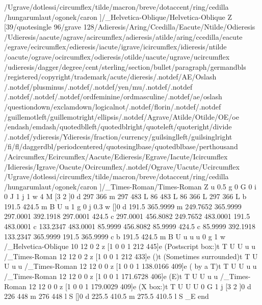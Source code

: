 {{{{{{{{{{{{{{{/Ugrave/dotlessi/circumflex/tilde/macron/breve/dotaccent/ring/cedilla
/hungarumlaut/ogonek/caron
]/_Helvetica-Oblique/Helvetica-Oblique Z
[39/quotesingle 96/grave 128/Adieresis/Aring/Ccedilla/Eacute/Ntilde/Odieresis
/Udieresis/aacute/agrave/acircumflex/adieresis/atilde/aring/ccedilla/eacute
/egrave/ecircumflex/edieresis/iacute/igrave/icircumflex/idieresis/ntilde
/oacute/ograve/ocircumflex/odieresis/otilde/uacute/ugrave/ucircumflex
/udieresis/dagger/degree/cent/sterling/section/bullet/paragraph/germandbls
/registered/copyright/trademark/acute/dieresis/.notdef/AE/Oslash
/.notdef/plusminus/.notdef/.notdef/yen/mu/.notdef/.notdef
/.notdef/.notdef/.notdef/ordfeminine/ordmasculine/.notdef/ae/oslash
/questiondown/exclamdown/logicalnot/.notdef/florin/.notdef/.notdef
/guillemotleft/guillemotright/ellipsis/.notdef/Agrave/Atilde/Otilde/OE/oe
/endash/emdash/quotedblleft/quotedblright/quoteleft/quoteright/divide
/.notdef/ydieresis/Ydieresis/fraction/currency/guilsinglleft/guilsinglright
/fi/fl/daggerdbl/periodcentered/quotesinglbase/quotedblbase/perthousand
/Acircumflex/Ecircumflex/Aacute/Edieresis/Egrave/Iacute/Icircumflex
/Idieresis/Igrave/Oacute/Ocircumflex/.notdef/Ograve/Uacute/Ucircumflex
/Ugrave/dotlessi/circumflex/tilde/macron/breve/dotaccent/ring/cedilla
/hungarumlaut/ogonek/caron
]/_Times-Roman/Times-Roman Z
u
0.5 g
0 G
0 i 0 J 1 j 1 w 4 M [3 2 ]0 d
297 366 m
297 483 L
86 483 L
86 366 L
297 366 L
b
191.5 424.5 m
B
U
u
1 g
0 j 0.3 w []0 d
191.5 365.9999 m
249.7652 365.9999 297.0001 392.1918 297.0001 424.5 c
297.0001 456.8082 249.7652 483.0001 191.5 483.0001 c
133.2347 483.0001 85.9999 456.8082 85.9999 424.5 c
85.9999 392.1918 133.2347 365.9999 191.5 365.9999 c
b
191.5 424.5 m
B
U
u
u
u
0 g
1 w
/_Helvetica-Oblique 10 12 0 2 z
[1 0 0 1 212 445]e
(Postscript box:)t
T
U
U
u
u
/_Times-Roman 12 12 0 2 z
[1 0 0 1 212 433]e
()t
(Sometimes surrounded)t
T
U
U
u
u
/_Times-Roman 12 12 0 0 z
[1 0 0 1 138.0166 409]e
( by a T)t
T
U
U
u
u
/_Times-Roman 12 12 0 0 z
[1 0 0 1 171.6728 406]e
(E)t
T
U
U
u
u
/_Times-Roman 12 12 0 0 z
[1 0 0 1 179.0029 409]e
(X box:)t
T
U
U
U
0 G
1 j [3 2 ]0 d
226 448 m
276 448 l
S
[]0 d
225.5 410.5 m
275.5 410.5 l
S
_E end
}}}}}}}}}}}}}}}
